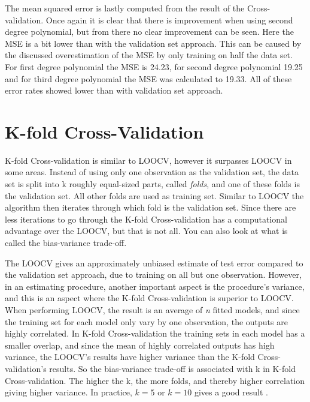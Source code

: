 

The mean squared error is lastly computed from the result of the Cross-validation. Once again it is clear that there is improvement when using second degree polynomial, but from there no clear improvement can be seen. Here the MSE is a bit lower than with the validation set approach. This can be caused by the discussed overestimation of the MSE by only training on half the  data set. For first degree polynomial the MSE is 24.23, for second degree polynomial 19.25 and for third degree polynomial the MSE was calculated to 19.33. All of these error rates showed lower than with validation set approach.


\section{K-fold Cross-Validation}
K-fold Cross-validation is similar to LOOCV, however it surpasses LOOCV in some areas. Instead of using only one observation as the validation set, the  data set is split into k roughly equal-sized parts, called \emph{folds}, and one of these folds is the validation set. All other folds are used as training set. Similar to LOOCV the algorithm then iterates through which fold is the validation set. Since there are less iterations to go through the K-fold Cross-validation has a computational advantage over the LOOCV, but that is not all. You can also look at what is called the bias-variance trade-off. 

The LOOCV gives an approximately unbiased estimate of test error compared to the validation set approach, due to training on all but one observation. However, in an estimating procedure, another important aspect is the procedure's variance, and this is an aspect where the K-fold Cross-validation is superior to LOOCV. When performing LOOCV, the result is an average of \emph{n} fitted models, and since the training set for each model only vary by one observation, the outputs are highly correlated. In K-fold Cross-validation the training sets in each model has a smaller overlap, and since the mean of highly correlated outputs has high variance, the LOOCV's results have higher variance than the K-fold Cross-validation's results. So the bias-variance trade-off is associated with k in K-fold Cross-validation. The higher the k, the more folds, and thereby higher correlation giving higher variance. In practice, $k=5$ or $k=10$ gives a good result \citep[pp. 183]{ISLR}.

